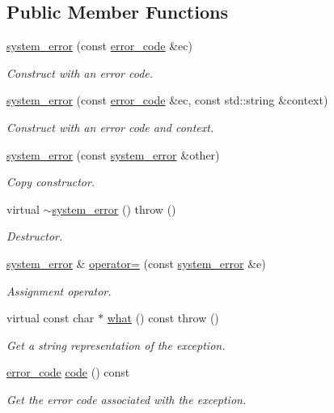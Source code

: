 \subsection*{Public Member Functions}
\begin{DoxyCompactItemize}
\item 
\hyperlink{classasio_1_1system__error_aba7cd01696f0126e7f094b3128ceeb60}{system\+\_\+error} (const \hyperlink{classasio_1_1error__code}{error\+\_\+code} \&ec)
\begin{DoxyCompactList}\small\item\em Construct with an error code. \end{DoxyCompactList}\item 
\hyperlink{classasio_1_1system__error_ab89cbea98d8cf57e2a4cb956a8a3fd12}{system\+\_\+error} (const \hyperlink{classasio_1_1error__code}{error\+\_\+code} \&ec, const std\+::string \&context)
\begin{DoxyCompactList}\small\item\em Construct with an error code and context. \end{DoxyCompactList}\item 
\hyperlink{classasio_1_1system__error_a8e39e420557609ad75b1c7e70cb003e9}{system\+\_\+error} (const \hyperlink{classasio_1_1system__error}{system\+\_\+error} \&other)
\begin{DoxyCompactList}\small\item\em Copy constructor. \end{DoxyCompactList}\item 
virtual \hyperlink{classasio_1_1system__error_ae86f36c5b491eba75700c833b9ae8a59}{$\sim$system\+\_\+error} ()  throw ()
\begin{DoxyCompactList}\small\item\em Destructor. \end{DoxyCompactList}\item 
\hyperlink{classasio_1_1system__error}{system\+\_\+error} \& \hyperlink{classasio_1_1system__error_a54a47d743fc8261140446649a479ba6d}{operator=} (const \hyperlink{classasio_1_1system__error}{system\+\_\+error} \&e)
\begin{DoxyCompactList}\small\item\em Assignment operator. \end{DoxyCompactList}\item 
virtual const char $\ast$ \hyperlink{classasio_1_1system__error_abb6744fbe0faf5303465535ac973840b}{what} () const   throw ()
\begin{DoxyCompactList}\small\item\em Get a string representation of the exception. \end{DoxyCompactList}\item 
\hyperlink{classasio_1_1error__code}{error\+\_\+code} \hyperlink{classasio_1_1system__error_aa4410b7f93f0da69b37780cd8cb778f1}{code} () const 
\begin{DoxyCompactList}\small\item\em Get the error code associated with the exception. \end{DoxyCompactList}\end{DoxyCompactItemize}


